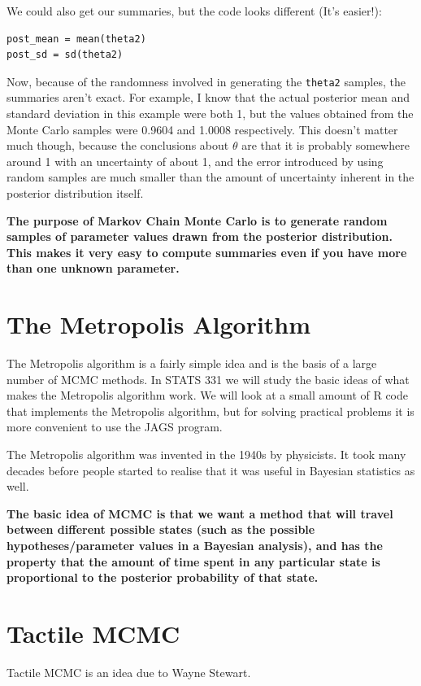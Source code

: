 We could also get our summaries, but the code looks different (It's easier!):
\begin{verbatim}
post_mean = mean(theta2)
post_sd = sd(theta2)
\end{verbatim}
Now, because of the randomness involved in generating the {\tt theta2} samples,
the summaries aren't exact. For example, I know that the actual posterior mean
and standard deviation in this example were both 1, but the values obtained
from the Monte Carlo samples were 0.9604 and 1.0008 respectively. This doesn't
matter much though, because the conclusions about $\theta$ are that it is probably
somewhere around 1 with an uncertainty of about 1, and the error introduced by
using random samples are much smaller than the amount of uncertainty inherent
in the posterior distribution itself.

\begin{framed}
{\bf
The purpose of Markov Chain Monte Carlo is to generate random samples of
parameter values drawn from the posterior distribution. This makes it very easy
to compute summaries even if you have more than one unknown parameter.}
\end{framed}


\section{The Metropolis Algorithm}
The Metropolis algorithm is a fairly simple idea and is the basis of a large
number of MCMC methods. In STATS 331 we will study the basic ideas of what
makes the Metropolis algorithm work. We will look at a small amount of R code
that implements the Metropolis algorithm, but for solving practical problems
it is more convenient to use the JAGS program.

The Metropolis algorithm was invented in the 1940s by physicists. It took
many decades before people started to realise that it was useful in Bayesian
statistics as well.

\begin{framed}
\begin{center}
{\bf
The basic idea of MCMC is that we want a method that will travel between
different possible states (such as the possible hypotheses/parameter values in
a Bayesian analysis), and has the property that the amount of time spent in
any particular state is proportional to the posterior probability of that state.}
\end{center}
\end{framed}



\section{Tactile MCMC}

Tactile MCMC is an idea due to Wayne Stewart.
